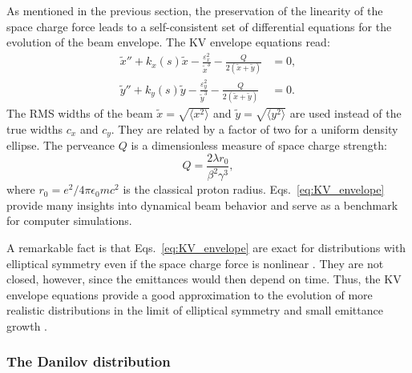 As mentioned in the previous section, the preservation of the linearity of the space charge force leads to a self-consistent set of differential equations for the evolution of the beam envelope. The KV envelope equations read:
%
\begin{align} \label{eq:KV_envelope}
    \tilde{x}'' + k_{x}(s)\tilde{x} - \frac{\varepsilon_x^2}{\tilde{x}^3} - \frac{Q}{2\left(\tilde{x} + \tilde{y}\right)} &= 0, \\
    \tilde{y}'' + k_{y}(s)\tilde{y} - \frac{\varepsilon_y^2}{\tilde{y}^3} - \frac{Q}{2\left(\tilde{x} + \tilde{y}\right)} &= 0. \nonumber
\end{align}
%
The RMS widths of the beam $\tilde{x} = \sqrt{\langle{{x^2}}\rangle}$ and $\tilde{y} = \sqrt{\langle{{y^2}}\rangle}$ are used instead of the true widths $c_x$ and $c_y$. They are related by a factor of two for a uniform density ellipse. The perveance $Q$ is a dimensionless measure of space charge strength:
%
\begin{equation}\label{eq:perveance}
    Q = \frac{2\lambda r_0}{\beta^2\gamma^3},
\end{equation}
%
where $r_0 = e^2 / 4\pi\epsilon_0mc^2$ is the classical proton radius. Eqs.~\eqref{eq:KV_envelope} provide many insights into dynamical beam behavior and serve as a benchmark for computer simulations.  

A remarkable fact is that Eqs.~\eqref{eq:KV_envelope} are exact for distributions with elliptical symmetry even if the space charge force is nonlinear \cite{Sacherer1968}. They are not closed, however, since the emittances would then depend on time. Thus, the KV envelope equations provide a good approximation to the evolution of more realistic distributions in the limit of elliptical symmetry and small emittance growth \cite{Lund2004}.


\subsubsection{The Danilov distribution}


